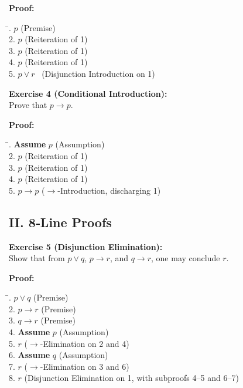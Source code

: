 \documentclass[12pt]{article}
\begin{document}
\textbf{Proof:}
\begin{tabbing}
\hspace*{2cm}\= . \quad \(p\) \quad \quad \quad (Premise)\\[0.5em]
2. \quad \(p\) \quad \quad \quad (Reiteration of 1)\\[0.5em]
3. \quad \(p\) \quad \quad \quad (Reiteration of 1)\\[0.5em]
4. \quad \(p\) \quad \quad \quad (Reiteration of 1)\\[0.5em]
5. \quad \(p\lor r\) \quad \ (Disjunction Introduction on 1)
\end{tabbing}

\bigskip
\textbf{Exercise 4 (Conditional Introduction):}\\[0.3em]
Prove that \(p\to p\).

\textbf{Proof:}
\begin{tabbing}
\hspace*{2cm}\= . \quad \textbf{Assume } \(p\) \quad (Assumption)\\[0.5em]
2. \quad \(p\) \quad \quad \quad (Reiteration of 1)\\[0.5em]
3. \quad \(p\) \quad \quad \quad (Reiteration of 1)\\[0.5em]
4. \quad \(p\) \quad \quad \quad (Reiteration of 1)\\[0.5em]
5. \quad \(p\to p\) \quad (\(\to\)-Introduction, discharging 1)
\end{tabbing}

\subsection{II. 8‐Line Proofs}

\bigskip
\textbf{Exercise 5 (Disjunction Elimination):}\\[0.3em]
Show that from \(p\lor q\), \(p\to r\), and \(q\to r\), one may conclude \(r\).

\textbf{Proof:}
\begin{tabbing}
\hspace*{2cm}\= . \quad \(p\lor q\) \quad \quad \quad (Premise)\\[0.5em]
2. \quad \(p\to r\) \quad \quad \quad (Premise)\\[0.5em]
3. \quad \(q\to r\) \quad \quad \quad (Premise)\\[0.5em]
4. \quad \textbf{Assume } \(p\) \quad \quad (Assumption)\\[0.5em]
5. \quad \(r\) \quad \quad \quad (\(\to\)-Elimination on 2 and 4)\\[0.5em]
6. \quad \textbf{Assume } \(q\) \quad \quad (Assumption)\\[0.5em]
7. \quad \(r\) \quad \quad \quad (\(\to\)-Elimination on 3 and 6)\\[0.5em]
8. \quad \(r\) \quad \quad \quad (Disjunction Elimination on 1, with subproofs 4–5 and 6–7)
\end{tabbing}
\end{document}
